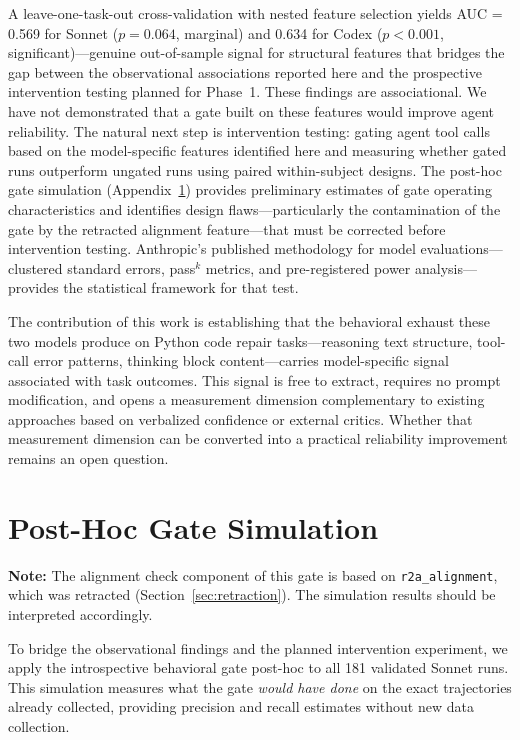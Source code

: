 \documentclass[11pt]{article}
\newcommand{\feat}[1]{\texttt{#1}}
\newcommand{\rtalign}{\feat{r2a\_alignment}}
\begin{document}
A leave-one-task-out cross-validation with nested feature selection yields AUC = 0.569 for Sonnet ($p = 0.064$, marginal) and 0.634 for Codex ($p < 0.001$, significant)---genuine out-of-sample signal for structural features that bridges the gap between the observational associations reported here and the prospective intervention testing planned for Phase~1.
These findings are associational.
We have not demonstrated that a gate built on these features would improve agent reliability.
The natural next step is intervention testing: gating agent tool calls based on the model-specific features identified here and measuring whether gated runs outperform ungated runs using paired within-subject designs.
The post-hoc gate simulation (Appendix~\ref{app:gate}) provides preliminary estimates of gate operating characteristics and identifies design flaws---particularly the contamination of the gate by the retracted alignment feature---that must be corrected before intervention testing.
Anthropic's published methodology for model evaluations---clustered standard errors, pass$^k$ metrics, and pre-registered power analysis---provides the statistical framework for that test.

The contribution of this work is establishing that the behavioral exhaust these two models produce on Python code repair tasks---reasoning text structure, tool-call error patterns, thinking block content---carries model-specific signal associated with task outcomes.
This signal is free to extract, requires no prompt modification, and opens a measurement dimension complementary to existing approaches based on verbalized confidence or external critics.
Whether that measurement dimension can be converted into a practical reliability improvement remains an open question.


\appendix

\section{Post-Hoc Gate Simulation}
\label{app:gate}

\textbf{Note:} The alignment check component of this gate is based on \rtalign{}, which was retracted (Section~\ref{sec:retraction}).
The simulation results should be interpreted accordingly.

To bridge the observational findings and the planned intervention experiment, we apply the introspective behavioral gate post-hoc to all 181 validated Sonnet runs.
This simulation measures what the gate \emph{would have done} on the exact trajectories already collected, providing precision and recall estimates without new data collection.
\end{document}
